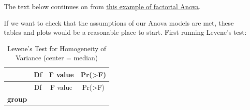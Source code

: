 \documentclass[]{article}
\newenvironment{Shaded}{\begin{snugshade}}{\end{snugshade}}
\newcommand{\KeywordTok}[1]{\textcolor[rgb]{0.13,0.29,0.53}{\textbf{#1}}}
\newcommand{\NormalTok}[1]{#1}
\newcommand{\OperatorTok}[1]{\textcolor[rgb]{0.81,0.36,0.00}{\textbf{#1}}}
\newcommand{\StringTok}[1]{\textcolor[rgb]{0.31,0.60,0.02}{#1}}
\begin{document}
{The text below continues on from
\protect\hyperlink{howell-factorial-example}{this example of factorial Anova}.}

If we want to check that the assumptions of our Anova models are met, these
tables and plots would be a reasonable place to start. First running Levene's
test:

\begin{Shaded}
\end{Shaded}

\begin{longtable}[]{@{}cccc@{}}
\caption{Levene's Test for Homogeneity of Variance (center = median)}\tabularnewline
\toprule
\begin{minipage}[b]{0.15\columnwidth}\centering
~\strut
\end{minipage} & \begin{minipage}[b]{0.06\columnwidth}\centering
Df\strut
\end{minipage} & \begin{minipage}[b]{0.12\columnwidth}\centering
F value\strut
\end{minipage} & \begin{minipage}[b]{0.12\columnwidth}\centering
Pr(\textgreater{}F)\strut
\end{minipage}\tabularnewline
\midrule
\endfirsthead
\toprule
\begin{minipage}[b]{0.15\columnwidth}\centering
~\strut
\end{minipage} & \begin{minipage}[b]{0.06\columnwidth}\centering
Df\strut
\end{minipage} & \begin{minipage}[b]{0.12\columnwidth}\centering
F value\strut
\end{minipage} & \begin{minipage}[b]{0.12\columnwidth}\centering
Pr(\textgreater{}F)\strut
\end{minipage}\tabularnewline
\midrule
\endhead
\begin{minipage}[t]{0.15\columnwidth}\centering
\textbf{group}\strut
\end{minipage} & \begin{minipage}[t]{0.06\columnwidth}\centering
9\strut
\end{minipage} & \begin{minipage}[t]{0.12\columnwidth}\centering

\end{minipage}
\end{longtable}
\end{document}
